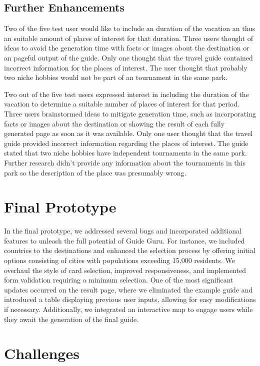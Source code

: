 \documentclass[english,notitlepage,smartquotes]{hgbreport}
\begin{document}
\subsection{Further Enhancements}
Two of the five test user would like to include an duration of the vacation an thus an suitable amount of places of interest for that duration. Three users thought of ideas to avoid the generation time with facts or images about the destination or an pageful output of the guide. Only one thought that the travel guide contained incorrect information for the places of interest. The user thought that probably two niche hobbies would not be part of an tournament in the same park.

Two out of the five test users expressed interest in including the duration of the vacation to determine a suitable number of places of interest for that period. Three users brainstormed ideas to mitigate generation time, such as incorporating facts or images about the destination or showing the result of each fully generated page as soon as it was available. Only one user thought that the travel guide provided incorrect information regarding the places of interest. The guide stated that two niche hobbies have independent tournaments in the same park. Further research didn't provide any information about the tournaments in this park so the description of the place was presumably wrong.

\section{Final Prototype}

In the final prototype, we addressed several bugs and incorporated additional features to unleash the full potential of Guide Guru. For instance, we included countries to the destinations and enhanced the selection process by offering initial options consisting of cities with populations exceeding 15,000 residents. We overhaul the style of card selection, improved responsiveness, and implemented form validation requiring a minimum selection. One of the most significant updates occurred on the result page, where we eliminated the example guide and introduced a table displaying previous user inputs, allowing for easy modifications if necessary. Additionally, we integrated an interactive map to engage users while they await the generation of the final guide.
 
\section{Challenges}
\end{document}
